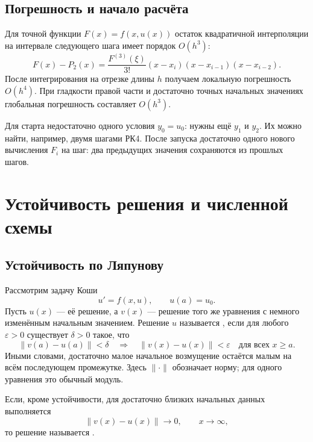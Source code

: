 \documentclass[../final.tex]{subfiles}
\begin{document}
\subsection{Погрешность и начало расчёта}

Для точной функции $F(x)=f(x,u(x))$ остаток квадратичной интерполяции
на интервале следующего шага имеет порядок $O(h^3)$:
\begin{equation*}
    F(x)-P_2(x)
    =\frac{F^{(3)}(\xi)}{3!}
    (x-x_i)(x-x_{i-1})(x-x_{i-2}).
\end{equation*}
После интегрирования на отрезке длины $h$ получаем локальную
погрешность $O(h^4)$. При гладкости правой части и достаточно точных
начальных значениях глобальная погрешность составляет $O(h^3)$.

Для старта недостаточно одного условия $y_0=u_0$: нужны ещё $y_1$ и $y_2$.
Их можно найти, например, двумя шагами РК4. После запуска достаточно
одного нового вычисления $F_i$ на шаг: два предыдущих значения
сохраняются из прошлых шагов.

\clearpage
\section{Устойчивость решения и численной схемы}

\subsection{Устойчивость по Ляпунову}

Рассмотрим задачу Коши
\begin{equation*}
    u'=f(x,u),\qquad u(a)=u_0.
\end{equation*}
Пусть $u(x)$ --- её решение, а $v(x)$ --- решение того же уравнения
с немного изменённым начальным значением.
Решение $u$ называется , если
для любого $\varepsilon>0$ существует $\delta>0$ такое, что
\begin{equation*}
    \|v(a)-u(a)\|<\delta
    \quad\Longrightarrow\quad
    \|v(x)-u(x)\|<\varepsilon\quad\text{для всех }x\ge a.
\end{equation*}
Иными словами, достаточно малое начальное возмущение остаётся малым
на всём последующем промежутке. Здесь $\|\cdot\|$ обозначает норму;
для одного уравнения это обычный модуль.

Если, кроме устойчивости, для достаточно близких начальных данных
выполняется
\begin{equation*}
    \|v(x)-u(x)\|\longrightarrow0,\qquad x\longrightarrow\infty,
\end{equation*}
то решение называется .
\end{document}
